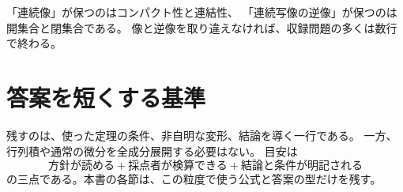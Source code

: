 「連続像」が保つのはコンパクト性と連結性、
「連続写像の逆像」が保つのは開集合と閉集合である。
像と逆像を取り違えなければ、収録問題の多くは数行で終わる。

\section{答案を短くする基準}

残すのは、使った定理の条件、非自明な変形、結論を導く一行である。
一方、行列積や通常の微分を全成分展開する必要はない。
目安は
\[
\boxed{\text{方針が読める}}
+\boxed{\text{採点者が検算できる}}
+\boxed{\text{結論と条件が明記される}}
\]
の三点である。本書の各節は、この粒度で使う公式と答案の型だけを残す。
